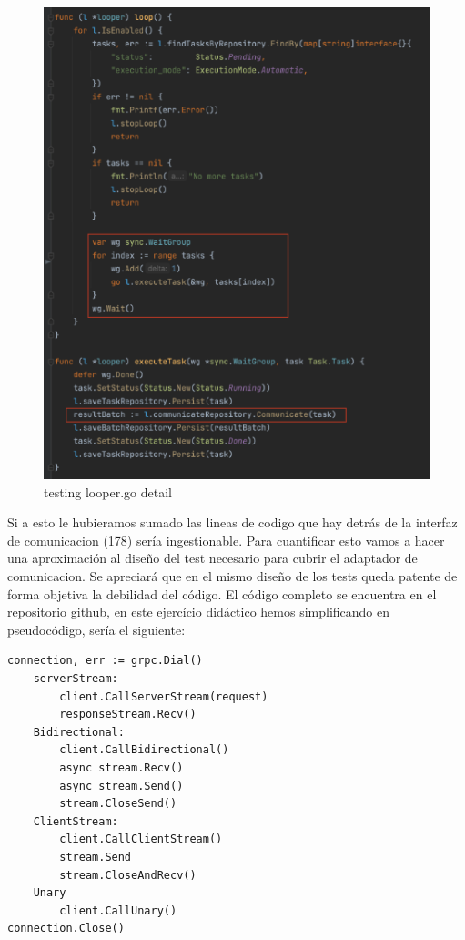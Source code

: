 \begin{figure}[h]
    \centering
    \includegraphics[height=0.5\textheight]{./part/Ejecucion/Seguimiento/Testing/img/Looper}
    \caption{testing looper.go detail}\label{fig:testingLooper}
\end{figure}

Si a esto le hubieramos sumado las lineas de codigo que hay detrás de la interfaz de comunicacion (178) sería ingestionable.
Para cuantificar esto vamos a hacer una aproximación al diseño del test necesario para cubrir el adaptador de comunicacion.
Se apreciará que en el mismo diseño de los tests queda patente de forma objetiva la debilidad del código.
El código completo se encuentra en el repositorio github, en este ejercício didáctico hemos simplificando en pseudocódigo, sería el siguiente:

\begin{verbatim}
connection, err := grpc.Dial()
    serverStream:
        client.CallServerStream(request)
        responseStream.Recv()
    Bidirectional:
        client.CallBidirectional()
        async stream.Recv()
        async stream.Send()
        stream.CloseSend()
    ClientStream:
        client.CallClientStream()
        stream.Send
        stream.CloseAndRecv()
    Unary
        client.CallUnary()
connection.Close()
\end{verbatim}

